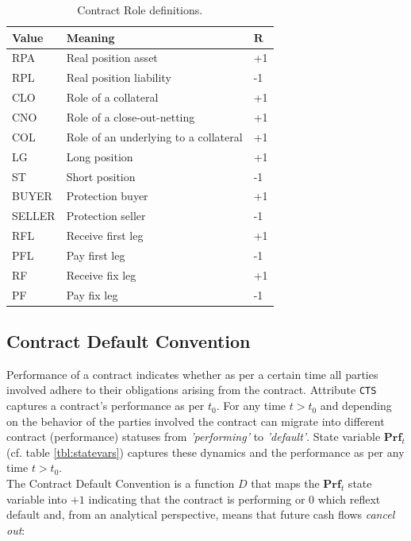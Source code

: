 \documentclass[9pt,oneside]{amsart}
\newcommand{\svar}[2]{\textbf{#1}_{#2}}
\newcommand{\attr}[1]{\texttt{#1}}
\begin{document}
\begin{multicols}{2}
\begin{table}[H]
	\centering
	\begin{tabular}{| p{0.5in}p{1.5in}p{0.2in} |}
	\hline
	\textbf{Value} & \textbf{Meaning} & $\textbf{R}$ \\
	\hline
	RPA & Real position asset & +1 \\
	\hline
	RPL & Real position liability & -1 \\
	\hline
	CLO & Role of a collateral & +1 \\
	\hline
	CNO & Role of a close-out-netting & +1 \\
	\hline
	COL & Role of an underlying to a collateral & +1 \\
	\hline
	LG & Long position & +1 \\
	\hline
	ST & Short position & -1 \\
	\hline
	BUYER & Protection buyer & +1 \\
	\hline
	SELLER & Protection seller & -1 \\
	\hline
	RFL & Receive first leg & +1 \\
	\hline
	PFL & Pay first leg & -1 \\
	\hline
	RF & Receive fix leg & +1 \\
	\hline
	PF & Pay fix leg & -1 \\
	\hline
	\end{tabular}
	\caption{Contract Role definitions.}
	\label{tbl:cntrl}
\end{table}




\subsection{Contract Default Convention}

Performance of a contract indicates whether as per a certain time all parties involved adhere to their obligations arising from the contract. Attribute \attr{CTS} captures a contract's performance as per $t_0$. For any time $t>t_0$ and depending on the behavior of the parties involved the contract can migrate into different contract (performance) statuses from \textit{'performing'} to \textit{'default'}. State variable $\svar{Prf}{t}$ (cf. table \ref{tbl:statevars}) captures these dynamics and the performance as per any time $t>t_0$.\\

The Contract Default Convention is a function $D$ that maps the $\svar{Prf}{t}$ state variable into $+1$ indicating that the contract is performing or $0$ which reflext default and, from an analytical perspective, means that future cash flows \textit{cancel out}:


\end{multicols}
\end{document}
